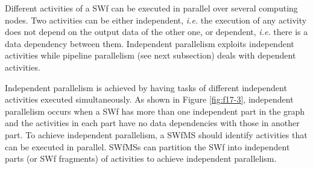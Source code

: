 Different activities of a SWf can be
executed in parallel over several computing nodes. 
Two activities can be either independent, \textit{i.e.} the execution of any activity does not depend on the output data of the other one, 
or dependent, \textit{i.e.} there is a data dependency between them.
Independent parallelism exploits independent activities while pipeline
parallelism (see next subsection) deals with dependent activities.

Independent parallelism is achieved by having tasks of different independent activities executed simultaneously. As shown in Figure \ref{fig:f17-3}, 
independent parallelism occurs when a SWf has more than
one independent part in the graph and the activities in each part have
no data dependencies with those in another part.
To achieve independent parallelism, a SWfMS should identify activities that can be executed in parallel.
SWfMSs can partition the SWf into independent parts (or SWf fragments) of activities to achieve independent parallelism.

